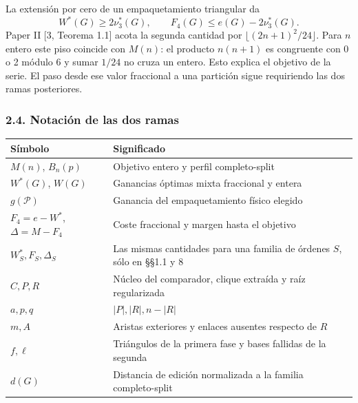 \documentclass[spanish,11pt,a4paper]{article}
\newcounter{none}
\begin{document}
La extensión por cero de un empaquetamiento triangular da \[
W^*(G)\ge2\nu_3^*(G),\qquad
F_4(G)\le e(G)-2\nu_3^*(G).
\tag{2.5}
\] Paper II {[}3, Teorema 1.1{]} acota la segunda cantidad por \(\lfloor(2n+1)^2/24\rfloor\). Para \(n\) entero este piso coincide con \(M(n)\): el producto \(n(n+1)\) es congruente con 0 o 2 módulo 6 y sumar \(1/24\) no cruza un entero. Esto explica el objetivo de la serie. El paso desde ese valor fraccional a una partición sigue requiriendo las dos ramas posteriores.

\subsubsection{2.4. Notación de las dos ramas}\label{notacion-de-las-dos-ramas}

{\def\LTcaptype{none} %
\begin{longtable}[c]{@{}
  >{\raggedright\arraybackslash}p{}
  >{\raggedright\arraybackslash}p{}@{}}
\toprule\noalign{}
\begin{minipage}[b]{\linewidth}\raggedright
Símbolo
\end{minipage} & \begin{minipage}[b]{\linewidth}\raggedright
Significado
\end{minipage} \\
\midrule\noalign{}
\endhead
\bottomrule\noalign{}
\endlastfoot
\(M(n)\), \(B_n(p)\) & Objetivo entero y perfil completo-split \\
\(W^*(G)\), \(W(G)\) & Ganancias óptimas mixta fraccional y entera \\
\(g(\mathcal P)\) & Ganancia del empaquetamiento físico elegido \\
\(F_4=e-W^*\), \(\Delta=M-F_4\) & Coste fraccional y margen hasta el objetivo \\
\(W_S^*,F_S,\Delta_S\) & Las mismas cantidades para una familia de órdenes \(S\), sólo en §§1.1 y 8 \\
\(C,P,R\) & Núcleo del comparador, clique extraída y raíz regularizada \\
\(a,p,q\) & \(|P|,|R|,n-|R|\) \\
\(m,A\) & Aristas exteriores y enlaces ausentes respecto de \(R\) \\
\(f,\ell\) & Triángulos de la primera fase y bases fallidas de la segunda \\
\(d(G)\) & Distancia de edición normalizada a la familia completo-split \\
\end{longtable}
}
\end{document}
